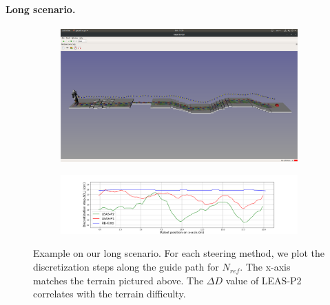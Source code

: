 \paragraph{Long scenario.}
\begin{figure}[ht]
    \captionsetup[subfigure]{justification=centering}
    \centering
    \begin{subfigure}[t]{0.9\linewidth}
        \includegraphics[trim={1cm 12cm 1cm 15cm}, clip,width=\textwidth]{Figures/Chapter_MIP_SL1M/1x11_guide_all_surf_steps.png}
    \end{subfigure}
    \begin{subfigure}[t]{0.9\linewidth}
        \includegraphics[trim={4cm 0cm 3.5cm 1.5cm}, clip,width=\textwidth]{Figures/Chapter_MIP_SL1M/res_mip/long_discr_x.png}
    \end{subfigure}
    \caption{Example on our long scenario. For each steering method, we plot the discretization steps along the guide path for $N_{ref}$. The x-axis matches the terrain pictured above. The $\Delta D$ value of LEAS-P2 correlates with the terrain difficulty.}
    \label{fig:mip:long_range}
\end{figure}

